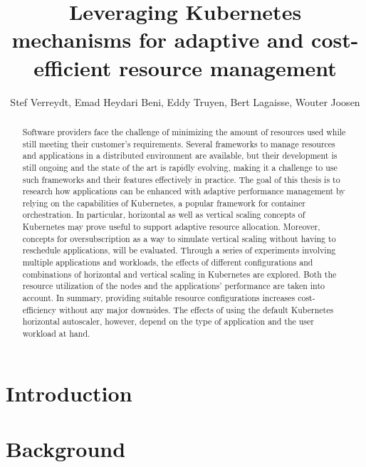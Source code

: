 \documentclass[sigplan,9pt]{acmart}
\begin{document}
\title{Leveraging Kubernetes mechanisms for adaptive and cost-efficient resource management}

\author{Stef Verreydt, Emad Heydari Beni, Eddy Truyen, Bert Lagaisse, Wouter Joosen}
\renewcommand{\shortauthors}{S. Verreydt et al.}

\begin{abstract}
Software providers face the challenge of minimizing the amount of resources used while still meeting their customer's requirements. Several frameworks to manage resources and applications in a distributed environment are available, but their development is still ongoing and the state of the art is rapidly evolving, making it a challenge to use such frameworks and their features effectively in practice. The goal of this thesis is to research how applications can be enhanced with adaptive performance management by relying on the capabilities of Kubernetes, a popular framework for container orchestration. In particular, horizontal as well as vertical scaling concepts of Kubernetes may prove useful to support adaptive resource allocation. Moreover, concepts for oversubscription as a way to simulate vertical scaling without having to reschedule applications, will be evaluated. Through a series of experiments involving multiple applications and workloads, the effects of different configurations and combinations of horizontal and vertical scaling in Kubernetes are explored. Both the resource utilization of the nodes and the applications' performance are taken into account. In summary, providing suitable resource configurations increases cost-efficiency without any major downsides. The effects of using the default Kubernetes horizontal autoscaler, however, depend on the type of application and the user workload at hand.
\end{abstract}

\maketitle


\section{Introduction}
\label{chap:introduction}


\section{Background}
\label{chap:background}

\end{document}
